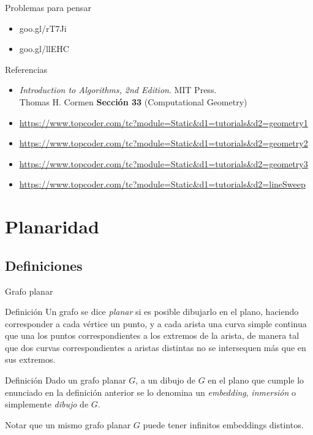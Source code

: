\documentclass[compress]{beamer}
\begin{document}
\begin{frame}{Problemas para pensar}

\begin{itemize}
\item goo.gl/rT7Ji
\item goo.gl/llEHC
\end{itemize}

\end{frame}

\begin{frame}{Referencias}
   \begin{itemize}
   \item \textit{Introduction to Algorithms, 2nd Edition}. MIT Press. \\ Thomas H. Cormen
   \textbf{Sección 33} (Computational Geometry)
   \item \url{https://www.topcoder.com/tc?module=Static&d1=tutorials&d2=geometry1}
   \item \url{https://www.topcoder.com/tc?module=Static&d1=tutorials&d2=geometry2}
   \item \url{https://www.topcoder.com/tc?module=Static&d1=tutorials&d2=geometry3}
   \item \url{https://www.topcoder.com/tc?module=Static&d1=tutorials&d2=lineSweep}
  \end{itemize}
  
\end{frame}

\section{Planaridad}

\subsection{Definiciones}

\begin{frame}{Grafo planar}

\begin{block}{Definición}
    Un grafo se dice \textit{planar} si es posible dibujarlo en el plano, haciendo corresponder a cada vértice un punto, y a cada arista una curva simple continua que una los puntos correspondientes a los extremos de la arista, de manera tal que dos curvas correspondientes a aristas distintas no se intersequen más que en sus extremos.
\end{block}

\begin{block}{Definición}
    Dado un grafo planar $G$, a un dibujo de $G$ en el plano que cumple lo enunciado en la definición anterior se lo denomina un \textit{embedding}, \textit{inmersión} o simplemente \textit{dibujo} de $G$.
\end{block}

Notar que un mismo grafo planar $G$ puede tener infinitos embeddings distintos.

\end{frame}
\end{document}
